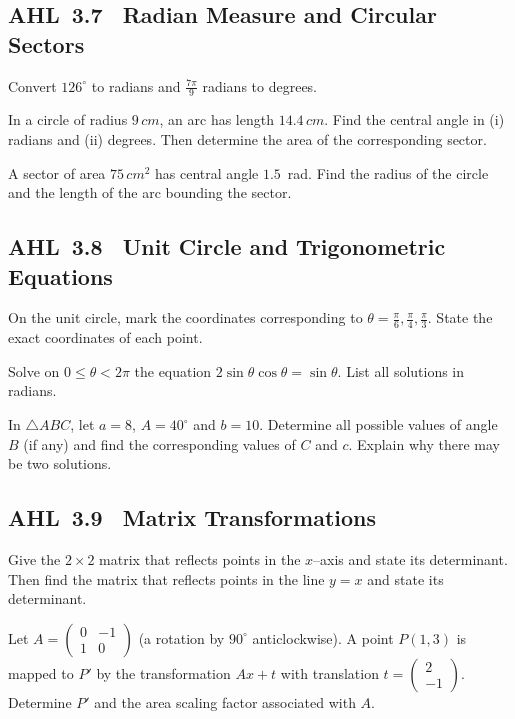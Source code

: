 \documentclass[11pt]{article}
\def\mathbf#1{#1}%
\def\mathrm#1{#1}%
\newcommand{\tocsubsection}[1]{\subsection{#1}}
\newcounter{question}
\begin{document}
\tocsubsection{AHL 3.7 \; Radian Measure and Circular Sectors}

\begin{question}
Convert $126^{\circ}$ to radians and $\tfrac{7\pi}{9}$ radians to degrees.
\end{question}

\begin{question}
In a circle of radius $9\,\mathrm{cm}$, an arc has length $14.4\,\mathrm{cm}$.
Find the central angle in (i) radians and (ii) degrees.  Then determine the
area of the corresponding sector.
\end{question}

\begin{question}
A sector of area $75\,\mathrm{cm}^2$ has central angle $1.5$~rad.
Find the radius of the circle and the length of the arc bounding the sector.
\end{question}

\tocsubsection{AHL 3.8 \; Unit Circle and Trigonometric Equations}

\begin{question}
On the unit circle, mark the coordinates corresponding to
\(\theta=\tfrac{\pi}{6},\tfrac{\pi}{4},\tfrac{\pi}{3}\).  State the exact
coordinates of each point.
\end{question}

\begin{question}
Solve on $0\le\theta<2\pi$ the equation $2\sin\theta\cos\theta=\sin\theta$.  List
all solutions in radians.
\end{question}

\begin{question}
In $\triangle ABC$, let $a=8$, $A=40^{\circ}$ and $b=10$.  Determine all
possible values of angle~$B$ (if any) and find the corresponding values of
$C$ and $c$.  Explain why there may be two solutions.
\end{question}

\tocsubsection{AHL 3.9 \; Matrix Transformations}

\begin{question}
Give the $2\times2$ matrix that reflects points in the $x$–axis and state its
determinant.  Then find the matrix that reflects points in the line $y=x$ and
state its determinant.
\end{question}

\begin{question}
Let $A=\begin{pmatrix}0 & -1 \\ 1 & 0\end{pmatrix}$ (a rotation by
$90^{\circ}$ anticlockwise).  A point $P(1,3)$ is mapped to $P'$ by the
transformation $A\mathbf{x}+\mathbf{t}$ with translation
$\mathbf{t}=\begin{pmatrix}2 \\ -1\end{pmatrix}$.  Determine $P'$ and the
area scaling factor associated with $A$.
\end{question}
\end{document}
